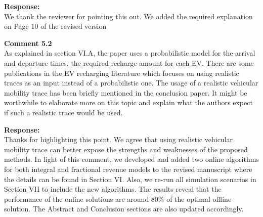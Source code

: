 \documentclass[11pt]{article}
\begin{document}
\vspace{7mm}
\noindent\textbf{Response:}\\
We thank the reviewer for pointing this out. We added the required explanation on Page $10$ of the revised version 

\vspace{5mm}
{\color{blue}
\noindent\textbf{Comment 5.2}\\
As explained in section VI.A, the paper uses a probabilistic model for the arrival and departure times, the required recharge amount for each EV. There are some publications in the EV recharging literature which focuses on using realistic traces as an input instead of a probabilistic one. The usage of a realistic vehicular mobility trace has been briefly mentioned in the conclusion paper. It might be worthwhile to elaborate more on this topic and explain what the authors expect if such a realistic trace would be used.}

\vspace{5mm}
\noindent\textbf{Response:}\\
Thanks for highlighting this point. We agree that using realistic vehicular mobility trace can better expose the strengths and weaknesses of the proposed methods. In light of this comment, we developed and added two online algorithms for both integral and fractional revenue models to the revised manuscript where the details can be found in Section VI. Also, we re-run all simulation scenarios in Section VII to include the new algorithms. The results reveal that the performance of the online solutions are around $80\%$ of the optimal offline solution. The Abstract and Conclusion sections are also updated accordingly.








\end{document}

